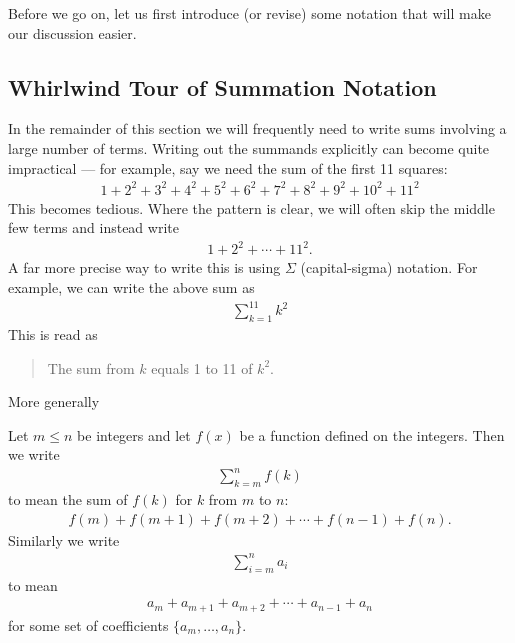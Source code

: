 Before we go on, let us first introduce (or revise) some notation that will make our
discussion easier.





\subsection*{Whirlwind Tour of Summation Notation}
In the remainder of this section we will frequently need to write sums involving a
large number of terms. Writing out the summands explicitly can become quite
impractical --- for example, say we need the sum of the first 11 squares:
\begin{align*}
  1 + 2^2 + 3^2 + 4^2+ 5^2 + 6^2 + 7^2 + 8^2 + 9^2 + 10^2 + 11^2
\end{align*}
This becomes tedious. Where the pattern is clear, we will often skip the middle few
terms and instead write
\begin{align*}
  1 + 2^2 + \cdots  + 11^2.
\end{align*}
A far more precise way to write this is using $\Sigma$ (capital-sigma) notation. For
example, we can write the above sum as
\begin{align*}
  \sum_{k=1}^{11} k^2
\end{align*}
This is read as
\begin{quote}
 The sum from $k$ equals 1 to 11 of $k^2$.
\end{quote}
More generally
\begin{notn}\label{ntn_3_4_1}
Let $m\leq n$ be integers and let $f(x)$ be a function defined on the integers.
Then we write
\begin{align*}
  \sum_{k=m}^n f(k)
\end{align*}
to mean the sum of $f(k)$ for $k$ from $m$ to $n$:
\begin{align*}
  f(m) + f(m+1) + f(m+2) + \cdots + f(n-1) + f(n).
\end{align*}
Similarly we write
\begin{align*}
  \sum_{i=m}^n a_i
\end{align*}
to mean
\begin{align*}
  a_m+a_{m+1}+a_{m+2}+\cdots+a_{n-1}+a_n
\end{align*}
for some set of coefficients $\{ a_m, \ldots, a_n \}$.
\end{notn}

